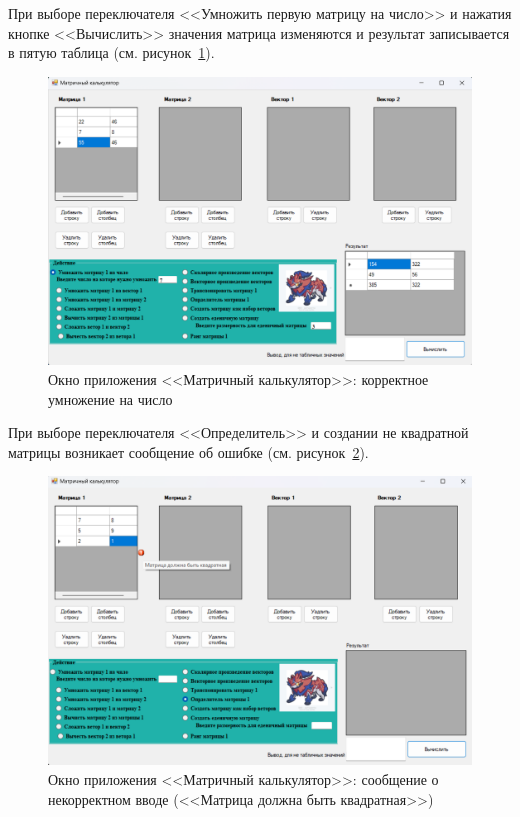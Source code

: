 \documentclass[bachelor, och, pract, times]{SCWorks}
\begin{document}
При выборе переключателя <<Умножить первую матрицу на число>> и нажатия кнопке <<Вычислить>> значения матрица изменяются и результат записывается в пятую таблица  (см. рисунок~\ref{fig:matrix-06}).



\begin{figure}[H]
    \centering
    \includegraphics[scale=0.4]{Скрины/Снимок экрана 2025-01-05 132152.png}
    \caption{Окно приложения <<Матричный калькулятор>>: корректное умножение на число}\label{fig:matrix-06}
\end{figure}

При выборе переключателя <<Определитель>> и создании не квадратной матрицы возникает сообщение об ошибке (см. рисунок~\ref{fig:matrix-07}).

\begin{figure}[H]
    \centering
    \includegraphics[scale=0.4]{Скрины/Снимок экрана 2025-01-05 132722.png}
    \caption{Окно приложения <<Матричный калькулятор>>: сообщение о некорректном вводе (<<Матрица должна быть квадратная>>)}\label{fig:matrix-07}
\end{figure}
\end{document}
